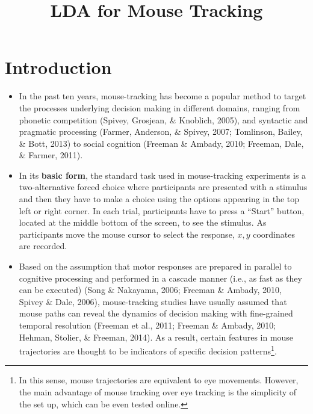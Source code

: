 \documentclass{article}
\title{LDA for Mouse Tracking}
\begin{document}
\maketitle
\tableofcontents

\section{Introduction}
\begin{itemize}

\item In the past ten years, mouse-tracking has become a popular method to target the processes underlying decision making in different domains, ranging from phonetic competition (Spivey, Grosjean, \& Knoblich, 2005), and syntactic and pragmatic processing (Farmer, Anderson, \& Spivey, 2007; Tomlinson, Bailey, \& Bott, 2013) to social cognition (Freeman \& Ambady, 2010; Freeman, Dale, \& Farmer, 2011). 

\item In its \textbf{basic form}, the standard task used in mouse-tracking experiments is a two-alternative forced choice where participants are presented with a stimulus and then they have to make a choice using the options appearing in the top left or right corner. In each trial, participants have to press a “Start” button, located at the middle bottom of the screen, to see the stimulus. As participants move the mouse cursor to select the response, $x,y$ coordinates are recorded. 

\item Based on the assumption that motor responses are prepared in parallel to cognitive processing and performed in a cascade manner (i.e., as fast as they can be executed) (Song \& Nakayama, 2006; Freeman \& Ambady, 2010, Spivey \& Dale, 2006), mouse-tracking studies have usually assumed that mouse paths can reveal the dynamics of decision making with fine-grained temporal resolution (Freeman et al., 2011; Freeman \& Ambady, 2010; Hehman, Stolier, \& Freeman, 2014).  
As a result, certain features in mouse trajectories are thought to be indicators of specific decision patterns\footnote{In this sense, mouse trajectories are equivalent to eye movements. However, the main advantage of mouse tracking over eye tracking is the simplicity of the set up, which can be even tested online.}. 



\end{itemize}
\end{document}

